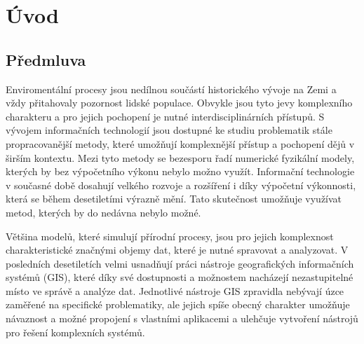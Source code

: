 \documentclass[a4paper,12pt,oneside]{report}
\newcommand{\necislovana}[1]{%
\phantomsection
\addcontentsline{toc}{section}{#1}
\section*{#1}
\markboth{\uppercase{#1}}{}
}
\begin{document}
\newpage

\newpage

\tableofcontents


\newpage
\necislovana{Úvod}

\pagestyle{fancy}
\fancyhf{}
\renewcommand{\sectionmark}[1]{\markboth{#1}{}} %
{}
\fancyhead[R]{\leftmark} %
\fancyfoot[C]{\thepage}


\setcounter{page}{1}
\subsection*{Předmluva}
Enviromentální procesy jsou nedílnou součástí historického vývoje na
Zemi a vždy přitahovaly pozornost lidské populace. Obvykle jsou tyto
jevy komplexního charakteru a pro jejich pochopení je nutné
interdisciplinárních přístupů. S vývojem informačních technologií jsou
dostupné ke studiu problematik stále propracovanější metody, které
umožňují komplexnější přístup a pochopení dějů v širším kontextu. Mezi
tyto metody se bezesporu řadí numerické fyzikální modely, kterých by
bez výpočetního výkonu nebylo možno využít. Informační technologie v
současné době dosahují velkého rozvoje a rozšíření i díky výpočetní
výkonnosti, která se během desetiletími výrazně mění. Tato skutečnost
umožňuje využívat metod, kterých by do nedávna nebylo možné.

Většina modelů, které simulují přírodní procesy, jsou pro jejich
komplexnost charakteristické značnými objemy dat, které je nutné
spravovat a analyzovat. V posledních desetiletích velmi usnadňují
práci nástroje geografických informačních systémů (GIS), které
 díky své dostupnosti a možnostem nacházejí nezastupitelné místo ve
správě a analýze dat. Jednotlivé nástroje GIS zpravidla nebývají úzce
zaměřené na specifické problematiky, ale jejich spíše obecný charakter
umožňuje návaznost a možné propojení s vlastními aplikacemi a ulehčuje
vytvoření nástrojů pro řešení komplexních systémů.
\end{document}
